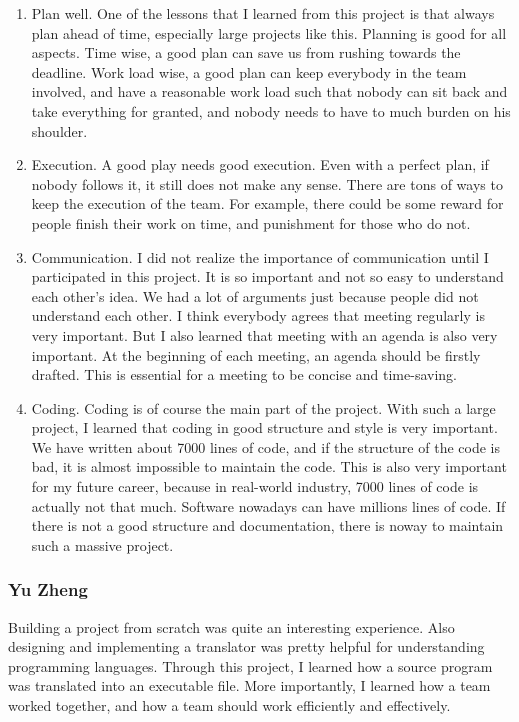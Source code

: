 \begin{enumerate}
\item
Plan well. One of the lessons that I learned from this project is that always plan ahead of
time, especially large projects like this. Planning is good for all aspects. Time wise, a good
plan can save us from rushing towards the deadline. Work load wise, a good plan can keep
everybody in the team involved, and have a reasonable work load such that nobody can sit back
and take everything for granted, and nobody needs to have to much burden on his shoulder. 
\item
Execution. A good play needs good execution. Even with a perfect plan, if nobody follows it,
it still does not make any sense. There are tons of ways to keep the execution of the team. For
example, there could be some reward for people finish their work on time, and punishment for
those who do not. 
\item
Communication. I did not realize the importance of communication until I participated in this
project. It is so important and not so easy to understand each other’s idea. We had a lot of
arguments just because people did not understand each other. I think everybody agrees that
meeting regularly is very important. But I also learned that meeting with an agenda is also very
important. At the beginning of each meeting, an agenda should be firstly drafted. This is
essential for a meeting to be concise and time-saving.
\item
Coding. Coding is of course the main part of the project. With such a large project, I
learned that coding in good structure and style is very important. We have written about 7000
lines of code, and if the structure of the code is bad, it is almost impossible to maintain the
code. This is also very important for my future career, because in real-world industry, 7000
lines of code is actually not that much. Software nowadays can have millions lines of code. If
there is not a good structure and documentation, there is noway to maintain such a massive
project. 
\end{enumerate}

\subsubsection{Yu Zheng}

Building a project from scratch was quite an interesting experience. Also designing and
implementing a translator was pretty helpful for understanding programming languages. Through
this project, I learned how a source program was translated into an executable  file. More
importantly, I learned how a team worked together, and how a team should work efficiently and
effectively.

